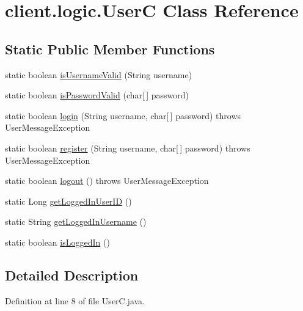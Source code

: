 \hypertarget{classclient_1_1logic_1_1_user_c}{}\section{client.\+logic.\+UserC Class Reference}
\label{classclient_1_1logic_1_1_user_c}
\subsection*{Static Public Member Functions}
\begin{DoxyCompactItemize}
\item 
static boolean \hyperlink{classclient_1_1logic_1_1_user_c_a62765c4c4912ee02b3ef70f1b9c0fb4e}{is\+Username\+Valid} (String username)
\item 
static boolean \hyperlink{classclient_1_1logic_1_1_user_c_a724d1799c3963f516238cdf0d85ccf52}{is\+Password\+Valid} (char\mbox{[}$\,$\mbox{]} password)
\item 
static boolean \hyperlink{classclient_1_1logic_1_1_user_c_aa3736b2a54be77a2b631ca49b9980a8c}{login} (String username, char\mbox{[}$\,$\mbox{]} password)  throws User\+Message\+Exception 
\item 
static boolean \hyperlink{classclient_1_1logic_1_1_user_c_a81ee75a5f1f4a278a71054a9c4f72609}{register} (String username, char\mbox{[}$\,$\mbox{]} password)  throws User\+Message\+Exception 
\item 
static boolean \hyperlink{classclient_1_1logic_1_1_user_c_a6609a9ab9414bda2dd3a6685cdec3771}{logout} ()  throws User\+Message\+Exception 
\item 
static Long \hyperlink{classclient_1_1logic_1_1_user_c_a984cd3489f4deea4f5b96c450635538a}{get\+Logged\+In\+User\+ID} ()
\item 
static String \hyperlink{classclient_1_1logic_1_1_user_c_a93ff0dc94af63f55144147389b0b2bdf}{get\+Logged\+In\+Username} ()
\item 
static boolean \hyperlink{classclient_1_1logic_1_1_user_c_ad4fb84e487e917c202a4e1bcdea62dd5}{is\+Logged\+In} ()
\end{DoxyCompactItemize}


\subsection{Detailed Description}


Definition at line 8 of file User\+C.\+java.



